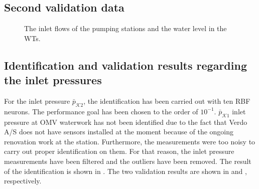    \subsection{Second validation data}
 \label{second_validation}
\vspace{-2mm}

  \begin{figure}[H]
  \centering
   
  \label{fig:inlet_flows_p3}
  \end{figure}
 \vspace{-8mm}


  \begin{figure}[H]
  \centering
   
  \label{fig:w3_p3}
  \end{figure}
 \vspace{-8mm}


  \begin{figure}[H]
  \centering
   
  \vspace{-2.5mm}
  \caption{The inlet flows of the pumping stations and the water level in the WTs.}
  \label{fig:w1_w2_p3}
  \end{figure}
  \vspace{-3mm}

 \subsection{Identification and validation results regarding the inlet pressures}
 \label{output_results}

 For the inlet pressure $\bar{p}_{\mathcal{K}2}$, the identification has been carried out with ten RBF neurons. The performance goal has been chosen to the order of $10^{-1}$. $\bar{p}_{\mathcal{K}1}$ inlet pressure at OMV waterwork has not been identified due to the fact that Verdo A/S does not have sensors installed at the moment because of the ongoing renovation work at the station. Furthermore, the measurements were too noisy to carry out proper identification on them. For that reason, the inlet pressure measurements have been filtered and the outliers have been removed. The result of the identification is shown in . The two validation results are shown in  and , respectively. 

